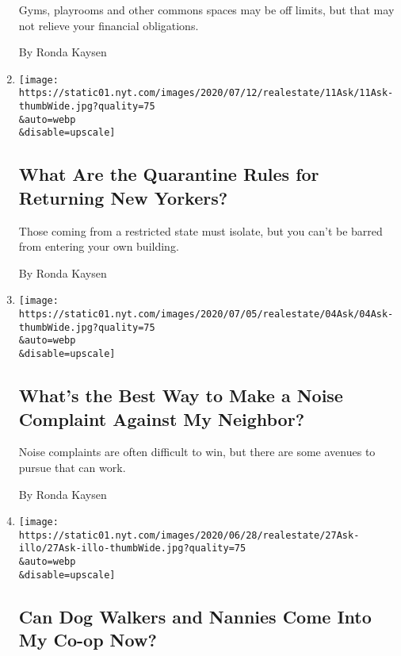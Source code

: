 \begin{enumerate}
  Gyms, playrooms and other commons spaces may be off limits, but that
  may not relieve your financial obligations.

  By Ronda Kaysen
\item
  \href{/2020/07/11/realestate/what-are-the-quarantine-rules-for-returning-new-yorkers-coronavirus.html}{}

  \texttt{[image: https://static01.nyt.com/images/2020/07/12/realestate/11Ask/11Ask-thumbWide.jpg?quality=75\\\&auto=webp\\\&disable=upscale]}

  \hypertarget{what-are-the-quarantine-rules-for-returning-new-yorkers}{%
  \subsection{What Are the Quarantine Rules for Returning New
  Yorkers?}\label{what-are-the-quarantine-rules-for-returning-new-yorkers}}

  Those coming from a restricted state must isolate, but you can't be
  barred from entering your own building.

  By Ronda Kaysen
\item
  \href{/2020/07/04/realestate/whats-the-best-way-to-make-a-noise-complaint-against-my-neighbor.html}{}

  \texttt{[image: https://static01.nyt.com/images/2020/07/05/realestate/04Ask/04Ask-thumbWide.jpg?quality=75\\\&auto=webp\\\&disable=upscale]}

  \hypertarget{whats-the-best-way-to-make-a-noise-complaint-against-my-neighbor}{%
  \subsection{What's the Best Way to Make a Noise Complaint Against My
  Neighbor?}\label{whats-the-best-way-to-make-a-noise-complaint-against-my-neighbor}}

  Noise complaints are often difficult to win, but there are some
  avenues to pursue that can work.

  By Ronda Kaysen
\item
  \href{/2020/06/29/realestate/coronavirus-phase-2-dog-walkers-nannies-co-op.html}{}

  \texttt{[image: https://static01.nyt.com/images/2020/06/28/realestate/27Ask-illo/27Ask-illo-thumbWide.jpg?quality=75\\\&auto=webp\\\&disable=upscale]}

  \hypertarget{can-dog-walkers-and-nannies-come-into-my-co-op-now}{%
  \subsection{Can Dog Walkers and Nannies Come Into My Co-op
  Now?}\label{can-dog-walkers-and-nannies-come-into-my-co-op-now}}


\end{enumerate}

